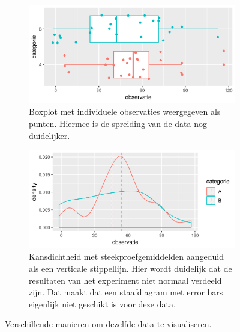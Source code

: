 \begin{figure}
  \begin{subfigure}{.5\textwidth}
    \includegraphics[width=\textwidth]{voorbeelden/boxplot-jitter.png}
    \caption{Boxplot met individuele observaties weergegeven als punten. Hiermee is de spreiding van de data nog duidelijker.}
    \label{fig:boxplot-jitter}
  \end{subfigure}
  \begin{subfigure}{.5\textwidth}
    \includegraphics[width=\textwidth]{voorbeelden/density-plot.png}
    \caption{Kansdichtheid met steekproefgemiddelden aangeduid als een verticale stippellijn. Hier wordt duidelijk dat de resultaten van het experiment niet normaal verdeeld zijn. Dat maakt dat een staafdiagram met error bars eigenlijk niet geschikt is voor deze data.}
    \label{fig:density-plot}
  \end{subfigure}
  
  \caption[Visualiseren van cijfergegevens]{Verschillende manieren om dezelfde data te visualiseren.}
\end{figure}